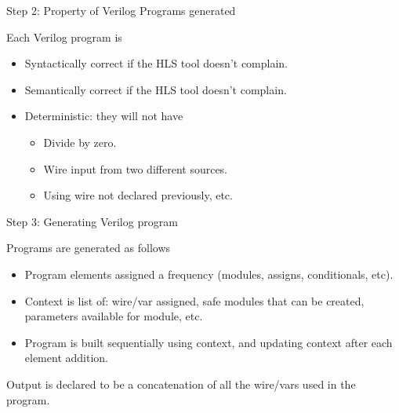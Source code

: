 \documentclass[xcolor=dvipsnames]{beamer}
\begin{document}
    \begin{frame}{Step 2: Property of Verilog Programs generated}

        Each Verilog program is 
        \begin{itemize}
            \item Syntactically correct if the HLS tool doesn't complain. 
            \item Semantically correct if the HLS tool doesn't complain. 
            \item Deterministic: they will not have 
                \begin{itemize}
                    \item Divide by zero.
                    \item Wire input from two different sources.
                    \item Using wire not declared previously, etc.
                \end{itemize} 

        \end{itemize}

    \end{frame}

    \begin{frame}{Step 3: Generating Verilog program}

        Programs are generated as follows
        \begin{itemize}
            \item Program elements assigned a frequency (modules, assigns, conditionals, etc).
            \item Context is list of: wire/var assigned, safe modules that can be created, parameters available for module, etc.
            \item Program is built sequentially using context, and updating context after each element addition.
        \end{itemize}

        Output is declared to be a concatenation of all the wire/vars used in the program. 

    \end{frame}
\end{document}
